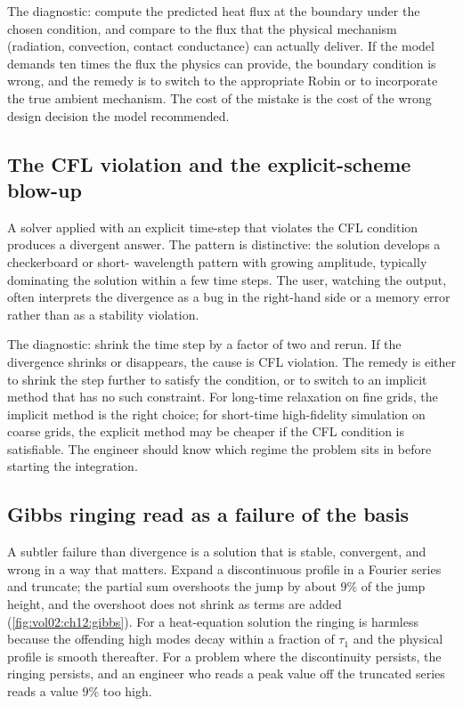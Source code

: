 The diagnostic: compute the predicted heat flux at the boundary
under the chosen condition, and compare to the flux that the
physical mechanism (radiation, convection, contact conductance)
can actually deliver. If the model demands ten times the flux the
physics can provide, the boundary condition is wrong, and the
remedy is to switch to the appropriate Robin or to incorporate
the true ambient mechanism. The cost of the mistake is the cost
of the wrong design decision the model recommended.

\subsection{The CFL violation and the explicit-scheme blow-up}

A solver applied with an explicit time-step that violates the
CFL condition produces a divergent answer. The pattern is
distinctive: the solution develops a checkerboard or short-
wavelength pattern with growing amplitude, typically dominating
the solution within a few time steps. The user, watching the
output, often interprets the divergence as a bug in the
right-hand side or a memory error rather than as a stability
violation.

The diagnostic: shrink the time step by a factor of two and rerun.
If the divergence shrinks or disappears, the cause is CFL
violation. The remedy is either to shrink the step further to
satisfy the condition, or to switch to an implicit method that
has no such constraint. For long-time relaxation on fine grids,
the implicit method is the right choice; for short-time
high-fidelity simulation on coarse grids, the explicit method may
be cheaper if the CFL condition is satisfiable. The engineer
should know which regime the problem sits in before starting the
integration.

\subsection{Gibbs ringing read as a failure of the basis}

A subtler failure than divergence is a solution that is stable,
convergent, and wrong in a way that matters. Expand a discontinuous
profile in a Fourier series and truncate; the partial sum overshoots
the jump by about $9\%$ of the jump height, and the overshoot does
not shrink as terms are added (\cref{fig:vol02:ch12:gibbs}). For a
heat-equation solution the ringing is harmless because the offending
high modes decay within a fraction of $\tau_{1}$ and the physical
profile is smooth thereafter. For a problem where the discontinuity
persists, the ringing persists, and an engineer who reads a peak
value off the truncated series reads a value $9\%$ too high.

